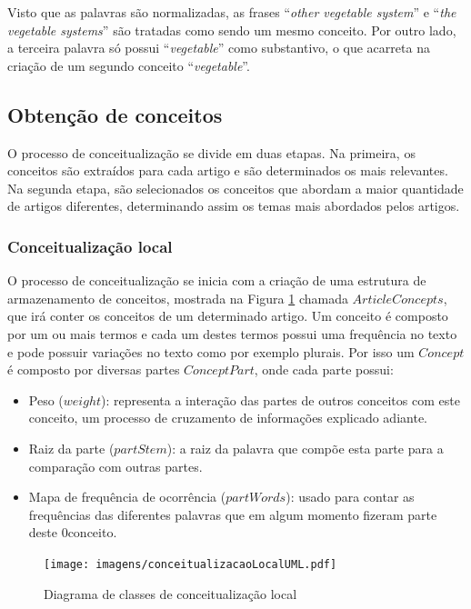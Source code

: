 \begin{enumerate}
Visto que as palavras são normalizadas, as frases “\emph{other vegetable system}” e “\emph{the vegetable systems}” são tratadas como sendo um mesmo conceito. Por outro lado, a terceira palavra só possui “\emph{vegetable}” como substantivo, o que acarreta na criação de um segundo conceito “\emph{vegetable}”.
\end{enumerate}



\subsection{Obtenção de conceitos}
O processo de conceitualização se divide em duas etapas. Na primeira, os conceitos são extraídos para cada artigo e são determinados os mais relevantes. Na segunda etapa, são selecionados os conceitos que abordam a maior quantidade de artigos diferentes, determinando assim os temas mais abordados pelos artigos.

\subsubsection{Conceitualização local}
O processo de conceitualização se inicia com a criação de uma estrutura de armazenamento de conceitos, mostrada na Figura \ref{fig:conceitualizacaoLocalUML} chamada $ArticleConcepts$, que irá conter os conceitos de um determinado artigo. Um conceito é composto por um ou mais termos e cada um destes termos possui uma frequência no texto e pode possuir variações no texto como por exemplo plurais. Por isso um $Concept$ é composto por diversas partes $ConceptPart$, onde cada parte possui:
\begin{itemize}
    \item Peso ($weight$): representa a interação das partes de outros conceitos com este conceito, um processo de cruzamento de informações explicado adiante.
    \item Raiz da parte ($partStem$): a raiz da palavra que compõe esta parte para a comparação com outras partes.
    \item Mapa de frequência de ocorrência ($partWords$): usado para contar as frequências das diferentes palavras que em algum momento fizeram parte deste 0conceito.
\end{itemize}

\begin{figure}[h!]
    \center
    \texttt{[image: imagens/conceitualizacaoLocalUML.pdf]}
    \caption{Diagrama de classes de conceitualização local \label{fig:conceitualizacaoLocalUML}}
\end{figure}


